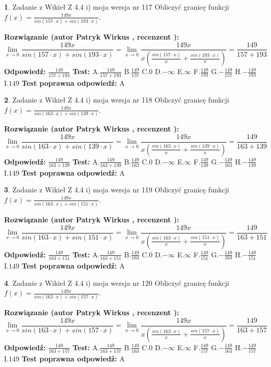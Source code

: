 \documentclass[12pt, a4paper]{article}
\theoremstyle{definition} %
\newtheorem{zad}{}
\newcommand{\zadStart}[1]{\begin{zad}#1\newline}
\newcommand{\zadStop}{\end{zad}}
\newcommand{\rozwStart}[2]{\noindent \textbf{Rozwiązanie (autor #1 , recenzent #2): }\newline}
\newcommand{\rozwStop}{\newline}
\newcommand{\odpStart}{\noindent \textbf{Odpowiedź:}\newline}
\newcommand{\odpStop}{\newline}
\newcommand{\testStart}{\noindent \textbf{Test:}\newline}
\newcommand{\testStop}{\newline}
\newcommand{\kluczStart}{\noindent \textbf{Test poprawna odpowiedź:}\newline}
\newcommand{\kluczStop}{\newline}
\begin{document}
\zadStart{Zadanie z Wikieł Z 4.4 i) moja wersja nr 117}
Obliczyć granicę funkcji $f(x)=\frac{149x}{sin(157\cdot x) +sin(193\cdot x)}$.
\zadStop
\rozwStart{Patryk Wirkus}{}
$$\lim\limits_{x\to 0}\frac{149x}{sin(157\cdot x) +sin(193\cdot x)}=\lim\limits_{x\to 0}\frac{149x}{x(\frac{sin(157\cdot x)}{x}+\frac{sin(193\cdot x)}{x})}=\frac{149}{157+193}$$
\rozwStop
\odpStart
$\frac{149}{157+193}$
\odpStop
\testStart
A.$\frac{149}{157+193}$
B.$\frac{149}{157}$
C.$0$
D.$-\infty$
E.$\infty$
F.$\frac{149}{193}$
G.$-\frac{149}{157}$
H.$-\frac{149}{193}$
I.$149$
\testStop
\kluczStart
A
\kluczStop



\zadStart{Zadanie z Wikieł Z 4.4 i) moja wersja nr 118}
Obliczyć granicę funkcji $f(x)=\frac{149x}{sin(163\cdot x) +sin(139\cdot x)}$.
\zadStop
\rozwStart{Patryk Wirkus}{}
$$\lim\limits_{x\to 0}\frac{149x}{sin(163\cdot x) +sin(139\cdot x)}=\lim\limits_{x\to 0}\frac{149x}{x(\frac{sin(163\cdot x)}{x}+\frac{sin(139\cdot x)}{x})}=\frac{149}{163+139}$$
\rozwStop
\odpStart
$\frac{149}{163+139}$
\odpStop
\testStart
A.$\frac{149}{163+139}$
B.$\frac{149}{163}$
C.$0$
D.$-\infty$
E.$\infty$
F.$\frac{149}{139}$
G.$-\frac{149}{163}$
H.$-\frac{149}{139}$
I.$149$
\testStop
\kluczStart
A
\kluczStop



\zadStart{Zadanie z Wikieł Z 4.4 i) moja wersja nr 119}
Obliczyć granicę funkcji $f(x)=\frac{149x}{sin(163\cdot x) +sin(151\cdot x)}$.
\zadStop
\rozwStart{Patryk Wirkus}{}
$$\lim\limits_{x\to 0}\frac{149x}{sin(163\cdot x) +sin(151\cdot x)}=\lim\limits_{x\to 0}\frac{149x}{x(\frac{sin(163\cdot x)}{x}+\frac{sin(151\cdot x)}{x})}=\frac{149}{163+151}$$
\rozwStop
\odpStart
$\frac{149}{163+151}$
\odpStop
\testStart
A.$\frac{149}{163+151}$
B.$\frac{149}{163}$
C.$0$
D.$-\infty$
E.$\infty$
F.$\frac{149}{151}$
G.$-\frac{149}{163}$
H.$-\frac{149}{151}$
I.$149$
\testStop
\kluczStart
A
\kluczStop



\zadStart{Zadanie z Wikieł Z 4.4 i) moja wersja nr 120}
Obliczyć granicę funkcji $f(x)=\frac{149x}{sin(163\cdot x) +sin(157\cdot x)}$.
\zadStop
\rozwStart{Patryk Wirkus}{}
$$\lim\limits_{x\to 0}\frac{149x}{sin(163\cdot x) +sin(157\cdot x)}=\lim\limits_{x\to 0}\frac{149x}{x(\frac{sin(163\cdot x)}{x}+\frac{sin(157\cdot x)}{x})}=\frac{149}{163+157}$$
\rozwStop
\odpStart
$\frac{149}{163+157}$
\odpStop
\testStart
A.$\frac{149}{163+157}$
B.$\frac{149}{163}$
C.$0$
D.$-\infty$
E.$\infty$
F.$\frac{149}{157}$
G.$-\frac{149}{163}$
H.$-\frac{149}{157}$
I.$149$
\testStop
\kluczStart
A
\kluczStop
\end{document}
